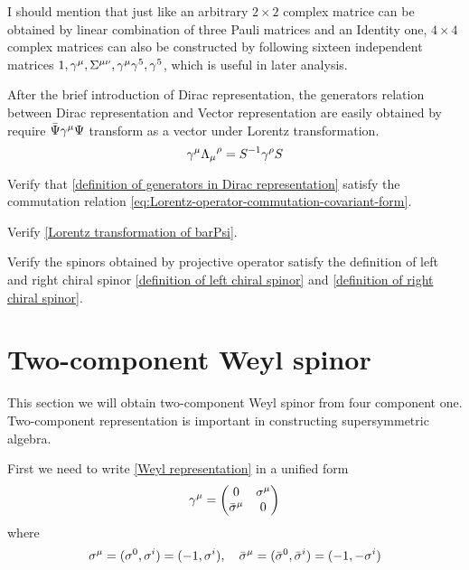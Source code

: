 I should mention that just like an arbitrary $2\times2$ complex matrice can be obtained by linear combination of three Pauli matrices and an Identity one, $4\times4$ complex matrices can also be constructed by following sixteen independent matrices $1,\gamma^{\mu},\Sigma^{\mu\nu},\gamma^{\mu}\gamma^5,\gamma^5$, which is useful in later analysis.

After the brief introduction of Dirac representation, the generators relation between Dirac representation and Vector representation are easily obtained by require $\bar{\Psi}\gamma^{\mu}\Psi$ transform as a vector under Lorentz transformation.
\begin{equation} \label{Lorentz transformation of gamma matrice}
\gamma^{\mu}{\Lambda_{\mu}}^{\rho}=S^{-1}\gamma^{\rho}S
\end{equation}

\begin{Exe}
Verify that \eqref{definition of generators in Dirac representation} satisfy the commutation relation \eqref{eq:Lorentz-operator-commutation-covariant-form}.
\end{Exe}
\begin{Exe}
Verify \eqref{Lorentz transformation of barPsi}.
\end{Exe}

\begin{Exe}
Verify the spinors obtained by projective operator satisfy the definition of left and right chiral spinor \eqref{definition of left chiral spinor} and
  \eqref{definition of right chiral spinor}.
\end{Exe}


\section{Two-component Weyl spinor}
This section we will obtain two-component Weyl spinor from four component one. Two-component representation is important in constructing supersymmetric algebra.

First we need to write \eqref{Weyl representation} in a unified form
\begin{equation} \label{unified form of gamma matrice}
\g^{\m} =\mqty( 0            & \s^{\m}\\
\bar{\s}^{\m}& 0     )
\end{equation}
where
\begin{equation}
  \sigma^{\mu} = (\sigma^0,\sigma^i) = (-1,\sigma^{i}),\quad
\bar{\sigma}^{\mu}=(\bar{\sigma}^0,\bar{\sigma}^i)=(-1,-\sigma^{i})
\end{equation}

